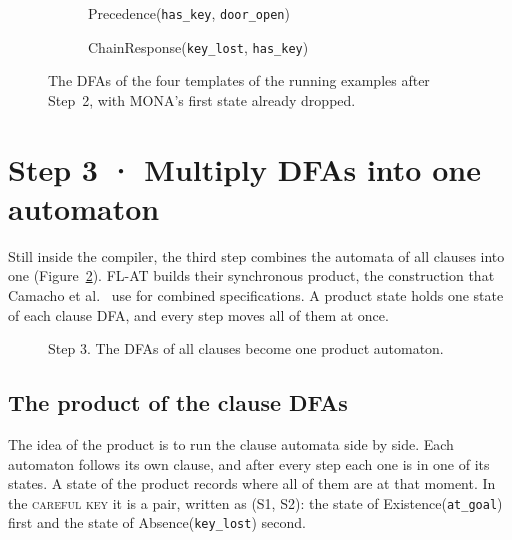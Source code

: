 \documentclass[11pt,english,listoffigures,listoftables]{tfgetsinf}
\newcommand{\runex}[1]{\textsc{#1}}  %
\begin{document}
\begin{figure}[H]
\begin{subfigure}[b]{0.49\textwidth}
    \caption{Precedence(\texttt{has\_key}, \texttt{door\_open})}
\end{subfigure}\hfill
\begin{subfigure}[b]{0.49\textwidth}
    \centering
    \caption{ChainResponse(\texttt{key\_lost}, \texttt{has\_key})}
\end{subfigure}
\caption[DFAs of the running examples]{The DFAs of the four templates of the running examples after Step~2, with MONA's first state already dropped.}
\label{fig:run-dfas}
\end{figure}

\section{Step 3 · Multiply DFAs into one automaton}
\label{sec:step3}
Still inside the compiler, the third step combines the automata of all clauses into one (Figure~\ref{fig:step3}). FL-AT builds their synchronous product, the construction that Camacho et al.~\cite{camacho2019ltl} use for combined specifications. A product state holds one state of each clause DFA, and every step moves all of them at once. 

\begin{figure}[H]
\centering
{}
\caption[Step 3 of FARM]{Step 3. The DFAs of all clauses become one product automaton.}
\label{fig:step3}
\end{figure}

\subsection{The product of the clause DFAs}
The idea of the product is to run the clause automata side by side. Each automaton follows its own clause, and after every step each one is in one of its states. A state of the product records where all of them are at that moment. In the \runex{careful key} it is a pair, written as (S1, S2): the state of Existence(\texttt{at\_goal}) first and the state of Absence(\texttt{key\_lost}) second.
\end{document}
